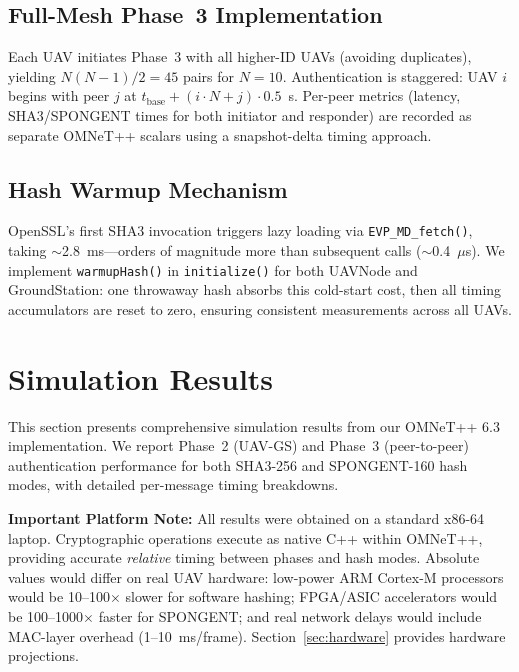 \documentclass[11pt,a4paper]{article}
\begin{document}
\subsection{Full-Mesh Phase~3 Implementation}

Each UAV initiates Phase~3 with all higher-ID UAVs (avoiding duplicates), yielding $N(N-1)/2 = 45$ pairs for $N = 10$. Authentication is staggered: UAV $i$ begins with peer $j$ at $t_{\text{base}} + (i \cdot N + j) \cdot 0.5$~s. Per-peer metrics (latency, SHA3/SPONGENT times for both initiator and responder) are recorded as separate OMNeT++ scalars using a snapshot-delta timing approach.

\subsection{Hash Warmup Mechanism}

OpenSSL's first SHA3 invocation triggers lazy loading via \texttt{EVP\_MD\_fetch()}, taking $\sim$2.8~ms---orders of magnitude more than subsequent calls ($\sim$0.4~$\mu$s). We implement \texttt{warmupHash()} in \texttt{initialize()} for both UAVNode and GroundStation: one throwaway hash absorbs this cold-start cost, then all timing accumulators are reset to zero, ensuring consistent measurements across all UAVs.

\section{Simulation Results}
\label{sec:results}

This section presents comprehensive simulation results from our OMNeT++ 6.3 implementation. We report Phase~2 (UAV-GS) and Phase~3 (peer-to-peer) authentication performance for both SHA3-256 and SPONGENT-160 hash modes, with detailed per-message timing breakdowns.

\textbf{Important Platform Note:} All results were obtained on a standard x86-64 laptop. Cryptographic operations execute as native C++ within OMNeT++, providing accurate \emph{relative} timing between phases and hash modes. Absolute values would differ on real UAV hardware: low-power ARM Cortex-M processors would be 10--100$\times$ slower for software hashing; FPGA/ASIC accelerators would be 100--1000$\times$ faster for SPONGENT; and real network delays would include MAC-layer overhead (1--10~ms/frame). Section~\ref{sec:hardware} provides hardware projections.
\end{document}
